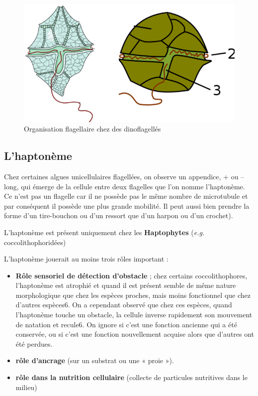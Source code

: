 \documentclass[
]{book}
\providecommand{\tightlist}{%
  \setlength{\itemsep}{0pt}\setlength{\parskip}{0pt}}
\begin{document}
\begin{figure}[H]

{\centering \includegraphics[width=8.51in]{images/dinoflagelles} 

}

\caption{Organisation flagellaire chez des dinoflagellés}\label{fig:dinoflagelles-flagelle}
\end{figure}

\hypertarget{lhaptonuxe8me}{%
\subsection{L'haptonème}\label{lhaptonuxe8me}}

Chez certaines algues unicellulaires flagellées, on observe un appendice, + ou -- long, qui émerge de la cellule entre deux flagelles que l'on nomme l'haptonème. Ce n'est pas un flagelle car il ne possède pas le même nombre de microtubule et par conséquent il possède une plus grande mobilité. Il peut aussi bien prendre la forme d'un tire-bouchon ou d'un ressort que d'un harpon ou d'un crochet).

L'haptonème est présent uniquement chez les \textbf{Haptophytes} (\emph{e.g.} coccolithophoridées)

L'haptonème jouerait au moins trois rôles important :

\begin{itemize}
\tightlist
\item
  \textbf{Rôle sensoriel de détection d'obstacle} ; chez certains coccolithophores, l'haptonème est atrophié et quand il est présent semble de même nature morphologique que chez les espèces proches, mais moins fonctionnel que chez d'autres espèces6. On a cependant observé que chez ces espèces, quand l'haptonème touche un obstacle, la cellule inverse rapidement son mouvement de natation et recule6. On ignore si c'est une fonction ancienne qui a été conservée, ou si c'est une fonction nouvellement acquise alors que d'autres ont été perdues.
\item
  \textbf{rôle d'ancrage} (sur un substrat ou une « proie »).
\item
  \textbf{rôle dans la nutrition cellulaire} (collecte de particules nutritives dans le milieu)
\end{itemize}
\end{document}
